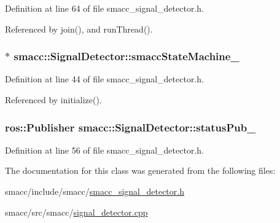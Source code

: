 Definition at line 64 of file smacc\+\_\+signal\+\_\+detector.\+h.



Referenced by join(), and run\+Thread().

\subsubsection[{\texorpdfstring{smacc\+State\+Machine\+\_\+}{smaccStateMachine_}}]{$\ast$ smacc\+::\+Signal\+Detector\+::smacc\+State\+Machine\+\_\+\hspace{0.3cm}{\ttfamily [private]}}\hypertarget{classsmacc_1_1SignalDetector_a46025de6ac7b5980e22144f9703236a4}{}\label{classsmacc_1_1SignalDetector_a46025de6ac7b5980e22144f9703236a4}


Definition at line 44 of file smacc\+\_\+signal\+\_\+detector.\+h.



Referenced by initialize().

\subsubsection[{\texorpdfstring{status\+Pub\+\_\+}{statusPub_}}]{\setlength{\rightskip}{0pt plus 5cm}ros\+::\+Publisher smacc\+::\+Signal\+Detector\+::status\+Pub\+\_\+\hspace{0.3cm}{\ttfamily [private]}}\hypertarget{classsmacc_1_1SignalDetector_ae065bbd4e699e5fce00fbc508dedd4c1}{}\label{classsmacc_1_1SignalDetector_ae065bbd4e699e5fce00fbc508dedd4c1}


Definition at line 56 of file smacc\+\_\+signal\+\_\+detector.\+h.



The documentation for this class was generated from the following files\+:\begin{DoxyCompactItemize}
\item 
smacc/include/smacc/\hyperlink{smacc__signal__detector_8h}{smacc\+\_\+signal\+\_\+detector.\+h}\item 
smacc/src/smacc/\hyperlink{signal__detector_8cpp}{signal\+\_\+detector.\+cpp}\end{DoxyCompactItemize}
